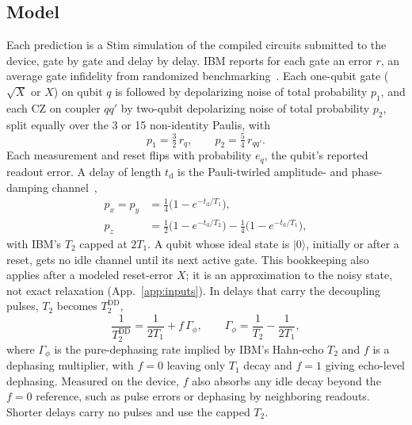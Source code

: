 \documentclass[aps,pra,reprint,nofootinbib,longbibliography,floatfix,showkeys]{revtex4-2}
\newcommand{\ket}[1]{\lvert #1\rangle}
\begin{document}
\subsection{Model}
\label{sec:modeldef}

Each prediction is a Stim simulation of the compiled circuits submitted to the device, gate by gate and delay by delay.
IBM reports for each gate an error $r$, an average gate infidelity from randomized benchmarking~\cite{ibmdocs,mckay2023benchmarking}.
Each one-qubit gate ($\sqrt{X}$ or $X$) on qubit $q$ is followed by depolarizing noise of total probability $p_1$, and each CZ on coupler $qq'$ by two-qubit depolarizing noise of total probability $p_2$, split equally over the 3 or 15 non-identity Paulis, with~\cite{nielsen2002simple}
\begin{equation}
  p_1 = \tfrac{3}{2}\, r_q , \qquad p_2 = \tfrac{5}{4}\, r_{qq'} .
  \label{eq:depol}
\end{equation}
Each measurement and reset flips with probability $e_q$, the qubit's reported readout error.
A delay of length $t_\mathrm{d}$ is the Pauli-twirled amplitude- and phase-damping channel~\cite{ghosh2012surface},
\begin{equation}
\begin{aligned}
p_x = p_y &= \tfrac14\bigl(1-e^{-t_\mathrm{d}/T_1}\bigr), \\
p_z &= \tfrac12\bigl(1-e^{-t_\mathrm{d}/T_2}\bigr) - \tfrac14\bigl(1-e^{-t_\mathrm{d}/T_1}\bigr),
\end{aligned}
\label{eq:idle}
\end{equation}
with IBM's $T_2$ capped at $2T_1$.
A qubit whose ideal state is $\ket{0}$, initially or after a reset, gets no idle channel until its next active gate.
This bookkeeping also applies after a modeled reset-error $X$; it is an approximation to the noisy state, not exact relaxation (App.~\ref{app:inputs}).
In delays that carry the decoupling pulses, $T_2$ becomes $T_2^{\mathrm{DD}}$,
\begin{equation}
\frac{1}{T_2^{\mathrm{DD}}} = \frac{1}{2T_1} + f\,\Gamma_\phi,
\qquad
\Gamma_\phi = \frac{1}{T_2}-\frac{1}{2T_1},
\label{eq:f}
\end{equation}
where $\Gamma_\phi$ is the pure-dephasing rate implied by IBM's Hahn-echo $T_2$ and $f$ is a dephasing multiplier, with $f=0$ leaving only $T_1$ decay and $f=1$ giving echo-level dephasing.
Measured on the device, $f$ also absorbs any idle decay beyond the $f=0$ reference, such as pulse errors or dephasing by neighboring readouts.
Shorter delays carry no pulses and use the capped $T_2$.
\end{document}
